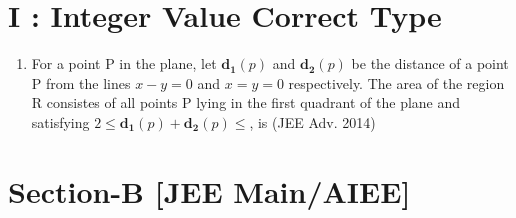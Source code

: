 \documentclass[12pt]{article}
\let\vec\mathbf
\begin{document}
\section*{I    :     Integer Value Correct Type }
\begin{enumerate}
		\fi
\item For a point P in the plane, let $\vec{d_1}(p)$ and $\vec{d_2}(p)$ be the distance of a point P
from the lines $x-y=0$ and $x=y=0$ respectively. The area of the region R consistes of all points P lying in the first quadrant of the plane and satisfying $2\leq \vec{d_1}(p)+\vec{d_2}(p)\leq$, is (JEE Adv. 2014)
\iffalse
\end{enumerate}

\section*{Section-B   [JEE Main/AIEE]}
\end{document}
